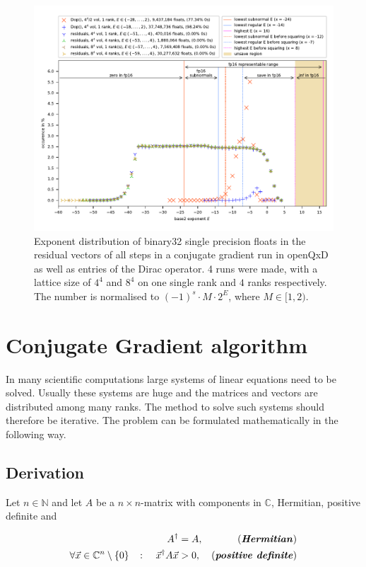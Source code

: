 \documentclass{article}
\theoremstyle{plain} %
\theoremstyle{convention} %
\theoremstyle{remark} %
\def\df#1{\textbf{\textit{#1}}}
\numberwithin{equation}{section}
\begin{document}
\begin{figure}
    \centering
    \includegraphics[width=1.0\textwidth]{plots/exponents_dirac}
    \caption{Exponent distribution of \gls{binary32} single precision floats in the residual vectors of all steps in a conjugate gradient run in openQxD as well as entries of the Dirac operator. 4 runs were made, with a lattice size of $4^4$ and $8^4$ on one single rank and $4$ ranks respectively. The number is normalised to $(-1)^s \cdot M \cdot 2^{E}$, where $M \in [1, 2)$.}
    \label{fig:exponents}
\end{figure}


\section{Conjugate Gradient algorithm}

In many scientific computations large systems of linear equations need to be solved. Usually these systems are huge and the matrices and vectors are distributed among many \glspl{rank}. The method to solve such systems should therefore be iterative. The problem can be formulated mathematically in the following way.

\subsection{Derivation}

Let $n \in \mathbb{N}$ and let $A$ be a $n \times n$-matrix with components in $\mathbb{C}$, Hermitian, positive definite and 

\begin{align*}
    A^{\dagger} &= A, &\text{(\df{Hermitian})} \\
    \forall \vec{x} \in \mathbb{C}^n \setminus \{0\} \quad \colon \quad \vec{x}^{\dagger} A \vec{x} &> 0, &\text{(\df{positive definite})}
\end{align*}
\end{document}
